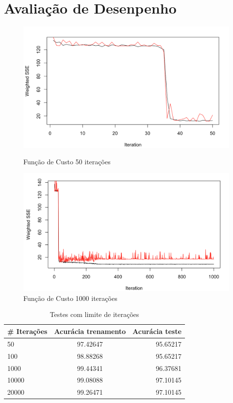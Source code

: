 \documentclass[conference]{IEEEtran}
\begin{document}
	
	
\section{Avaliação de Desenpenho}
    
        \begin{figure}[htbp]
	\centerline{\includegraphics[scale=0.4]{imagens/9,8,8,5,3-50.png}}
	\caption{Função de Custo 50 iterações}
	
	\centerline{\includegraphics[scale=0.4]{imagens/9,8,8,5,3-1000.png}}
	\caption{Função de Custo 1000 iterações}
	\label{fig}
	\end{figure}
	
	\begin{table}[]
	\caption{Testes com limite de iterações}
	\begin{center}
    \begin{tabular}{l | c | r }
    \hline
         \# Iterações &Acurácia trenamento  & Acurácia teste \\\hline
         50 &97.42647  &95.65217    \\\hline
         100 &98.88268  &95.65217    \\\hline
         1000 &99.44341  &96.37681    \\\hline
         10000 &99.08088  &97.10145   \\\hline
         20000 &99.26471  &97.10145  \\\hline
    \end{tabular}
    \end{center}
    \end{table}
\end{document}

